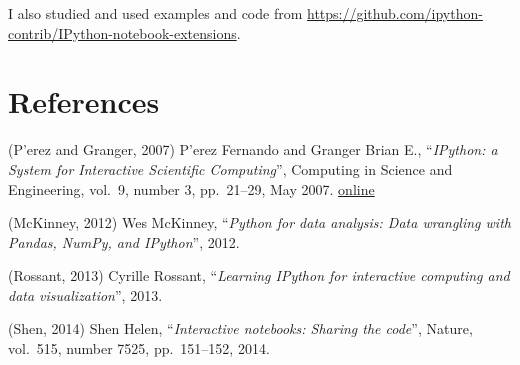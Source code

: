 \documentclass[11pt]{article}
\begin{document}
I also studied and used examples and code from
\url{https://github.com/ipython-contrib/IPython-notebook-extensions}.

    \section{References}\label{references}

(P'erez and Granger, 2007) P'erez Fernando and Granger Brian E.,
``\emph{IPython: a System for Interactive Scientific Computing}'',
Computing in Science and Engineering, vol.~9, number 3, pp.~21--29, May
2007. \href{http://ipython.org}{online}

(McKinney, 2012) Wes McKinney, ``\emph{Python for data analysis: Data
wrangling with Pandas, NumPy, and IPython}'', 2012.

(Rossant, 2013) Cyrille Rossant, ``\emph{Learning IPython for
interactive computing and data visualization}'', 2013.

(Shen, 2014) Shen Helen, ``\emph{Interactive notebooks: Sharing the
code}'', Nature, vol.~515, number 7525, pp.~151--152, 2014.


    
    
    
    
\end{document}
